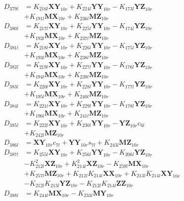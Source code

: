 \begin{align}
D_{379l} &= K_{216l}\mathbf{XY}_{10r} + K_{224l}\mathbf{YY}_{10r} - K_{173l}\mathbf{YZ}_{10r}  \nonumber \\
&+ K_{191l}\mathbf{MX}_{10r} + K_{236l}\mathbf{MZ}_{10r} \nonumber \\
D_{380l} &= K_{217l}\mathbf{XY}_{10r} + K_{225l}\mathbf{YY}_{10r} - K_{174l}\mathbf{YZ}_{10r}  \nonumber \\
&+ K_{192l}\mathbf{MX}_{10r} + K_{237l}\mathbf{MZ}_{10r} \nonumber \\
D_{381l} &= K_{218l}\mathbf{XY}_{10r} + K_{226l}\mathbf{YY}_{10r} - K_{175l}\mathbf{YZ}_{10r}  \nonumber \\
&+ K_{193l}\mathbf{MX}_{10r} + K_{238l}\mathbf{MZ}_{10r} \nonumber \\
D_{382l} &= K_{219l}\mathbf{XY}_{10r} + K_{227l}\mathbf{YY}_{10r} - K_{176l}\mathbf{YZ}_{10r}  \nonumber \\
&+ K_{194l}\mathbf{MX}_{10r} + K_{239l}\mathbf{MZ}_{10r} \nonumber \\
D_{383l} &= K_{220l}\mathbf{XY}_{10r} + K_{228l}\mathbf{YY}_{10r} - K_{177l}\mathbf{YZ}_{10r}  \nonumber \\
&+ K_{195l}\mathbf{MX}_{10r} + K_{240l}\mathbf{MZ}_{10r} \nonumber \\
D_{384l} &= K_{221l}\mathbf{XY}_{10r} + K_{229l}\mathbf{YY}_{10r} - K_{178l}\mathbf{YZ}_{10r}  \nonumber \\
&+ K_{196l}\mathbf{MX}_{10r} + K_{241l}\mathbf{MZ}_{10r} \nonumber \\
D_{385l} &= K_{222l}\mathbf{XY}_{10r} + K_{230l}\mathbf{YY}_{10r} - \mathbf{YZ}_{10r}c_{6l}  \nonumber \\
&+ K_{242l}\mathbf{MZ}_{10r} \nonumber \\
D_{386l} &= \mathbf{XY}_{10r}c_{7l} + \mathbf{YY}_{10r}s_{7l} + K_{243l}\mathbf{MZ}_{10r} \nonumber \\
D_{387l} &= K_{255l}\mathbf{XY}_{10r} + K_{256l}\mathbf{YY}_{10r} - K_{206l}\mathbf{YZ}_{10r}  \nonumber \\
&- K_{212l}^2\mathbf{XZ}_{10r} + K_{214l}^2\mathbf{XZ}_{10r} - K_{259l}\mathbf{MX}_{10r}  \nonumber \\
&+ K_{257l}\mathbf{MZ}_{10r} + K_{212l}K_{214l}\mathbf{XX}_{10r} + K_{213l}K_{214l}\mathbf{XY}_{10r}  \nonumber \\
&- K_{212l}K_{213l}\mathbf{YZ}_{10r} - K_{212l}K_{214l}\mathbf{ZZ}_{10r} \nonumber \\
D_{388l} &= K_{244l}\mathbf{MX}_{10r} - K_{233l}\mathbf{MY}_{10r} \nonumber \\

\end{align}
